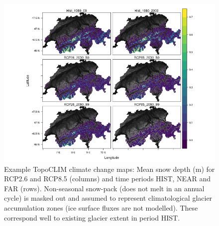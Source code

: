 \documentclass[hess, manuscript]{copernicus}
\begin{document}
\begin{figure}[t]
\includegraphics[width=20cm]{"plots/swe.png"}
\caption{Example TopoCLIM climate change maps: Mean snow depth (m) for RCP2.6 and RCP8.5 (columns) and time periods HIST, NEAR and FAR (rows). Non-seasonal snow-pack (does not melt in an annual cycle) is masked out and assumed to represent climatological glacier accumulation zones (ice surface fluxes are not modelled). These correspond well to existing glacier extent in period HIST. }
\end{figure}

\end{document}

